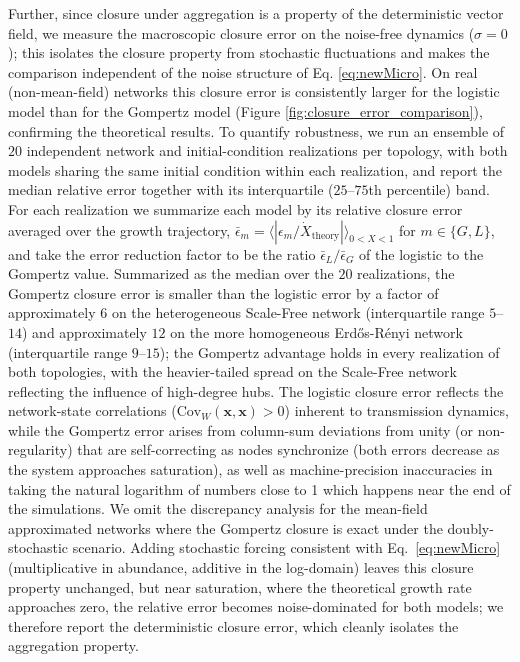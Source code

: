 \documentclass{article}
\begin{document}
Further, since closure under aggregation is a property of the deterministic vector field, we measure the macroscopic closure error on the noise-free dynamics ($\sigma = 0$); this isolates the closure property from stochastic fluctuations and makes the comparison independent of the noise structure of Eq. \ref{eq:newMicro}. On real (non-mean-field) networks this closure error is consistently larger for the logistic model than for the Gompertz model (Figure \ref{fig:closure_error_comparison}), confirming the theoretical results. To quantify robustness, we run an ensemble of $20$ independent network and initial-condition realizations per topology, with both models sharing the same initial condition within each realization, and report the median relative error together with its interquartile ($25$--$75$th percentile) band. For each realization we summarize each model by its relative closure error averaged over the growth trajectory, $\bar{\epsilon}_m = \langle |\epsilon_m / \dot{X}_{\text{theory}}| \rangle_{0 < X < 1}$ for $m \in \{G, L\}$, and take the error reduction factor to be the ratio $\bar{\epsilon}_L / \bar{\epsilon}_G$ of the logistic to the Gompertz value. Summarized as the median over the $20$ realizations, the Gompertz closure error is smaller than the logistic error by a factor of approximately $6$ on the heterogeneous Scale-Free network (interquartile range $5$--$14$) and approximately $12$ on the more homogeneous Erdős-Rényi network (interquartile range $9$--$15$); the Gompertz advantage holds in every realization of both topologies, with the heavier-tailed spread on the Scale-Free network reflecting the influence of high-degree hubs. The logistic closure error reflects the network-state correlations ($\text{Cov}_W(\mathbf{x}, \mathbf{x}) > 0$) inherent to transmission dynamics, while the Gompertz error arises from column-sum deviations from unity (or non-regularity) that are self-correcting as nodes synchronize (both errors decrease as the system approaches saturation), as well as machine-precision inaccuracies in taking the natural logarithm of numbers close to 1 which happens near the end of the simulations. We omit the discrepancy analysis for the mean-field approximated networks where the Gompertz closure is exact under the doubly-stochastic scenario. Adding stochastic forcing consistent with Eq.\ \ref{eq:newMicro} (multiplicative in abundance, additive in the log-domain) leaves this closure property unchanged, but near saturation, where the theoretical growth rate approaches zero, the relative error becomes noise-dominated for both models; we therefore report the deterministic closure error, which cleanly isolates the aggregation property.
\end{document}

